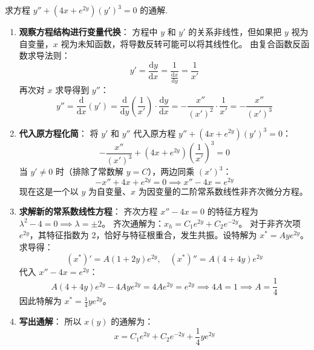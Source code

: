 \documentclass[lang=cn,11pt]{elegantbook}
\begin{document}
\begin{exercise}[自变量与因变量互换求解]
求方程 $y''+(4x+e^{2y})(y')^3=0$ 的通解. 
\end{exercise}
\begin{solution}
\begin{enumerate}
    \item \textbf{观察方程结构进行变量代换}：
    方程中 $y$ 和 $y'$ 的关系非线性，但如果把 $y$ 视为自变量，$x$ 视为未知函数，将导数反转可能可以将其线性化。
    由复合函数反函数求导法则：
    \[
    y' = \frac{\mathrm{d}y}{\mathrm{d}x} = \frac{1}{\frac{\mathrm{d}x}{\mathrm{d}y}} = \frac{1}{x'}
    \]
    再次对 $x$ 求导得到 $y''$：
    \[
    y'' = \frac{\mathrm{d}}{\mathrm{d}x}(y') = \frac{\mathrm{d}}{\mathrm{d}y}\left(\frac{1}{x'}\right) \cdot \frac{\mathrm{d}y}{\mathrm{d}x} = -\frac{x''}{(x')^2} \cdot \frac{1}{x'} = -\frac{x''}{(x')^3}
    \]
    
    \item \textbf{代入原方程化简}：
    将 $y'$ 和 $y''$ 代入原方程 $y''+(4x+e^{2y})(y')^3=0$：
    \[
    -\frac{x''}{(x')^3} + (4x+e^{2y}) \left(\frac{1}{x'}\right)^3 = 0
    \]
    当 $y' \neq 0$ 时（排除了常数解 $y=C$），两边同乘 $(x')^3$：
    \[
    -x'' + 4x + e^{2y} = 0 \implies x'' - 4x = e^{2y}
    \]
    现在这是一个以 $y$ 为自变量、$x$ 为因变量的二阶常系数线性非齐次微分方程。
    
    \item \textbf{求解新的常系数线性方程}：
    齐次方程 $x'' - 4x = 0$ 的特征方程为 $\lambda^2 - 4 = 0 \implies \lambda = \pm 2$。
    齐次通解为：$x_h = C_1 e^{2y} + C_2 e^{-2y}$。
    对于非齐次项 $e^{2y}$，其特征指数为 2，恰好与特征根重合，发生共振。设特解为 $x^* = A y e^{2y}$。
    求导得：
    \[
    (x^*)' = A(1+2y)e^{2y}, \quad (x^*)'' = A(4+4y)e^{2y}
    \]
    代入 $x'' - 4x = e^{2y}$：
    \[
    A(4+4y)e^{2y} - 4A y e^{2y} = 4A e^{2y} = e^{2y} \implies 4A = 1 \implies A = \frac{1}{4}
    \]
    因此特解为 $x^* = \frac{1}{4} y e^{2y}$。
    
    \item \textbf{写出通解}：
    所以 $x(y)$ 的通解为：
    \[
    x = C_1 e^{2y} + C_2 e^{-2y} + \frac{1}{4} y e^{2y}
    \]
\end{enumerate}
\end{solution}
\end{document}
